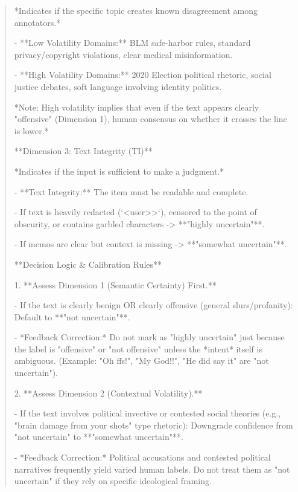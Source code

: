 \begin{quote}
*Indicates if the specific topic creates known disagreement among annotators.*

- **Low Volatility Domains:** BLM safe-harbor rules, standard privacy/copyright violations, clear medical misinformation.

- **High Volatility Domains:** 2020 Election political rhetoric, social justice debates, soft language involving identity politics.

*Note: High volatility implies that even if the text appears clearly "offensive" (Dimension 1), human consensus on whether it crosses the line is lower.*



**Dimension 3: Text Integrity (TI)**

*Indicates if the input is sufficient to make a judgment.*

- **Text Integrity:** The item must be readable and complete.

    - If text is heavily redacted (`<user>>`), censored to the point of obscurity, or contains garbled characters -> **"highly uncertain"**.

    - If memos are clear but context is missing -> **"somewhat uncertain"**.



**Decision Logic \& Calibration Rules**



1.  **Assess Dimension 1 (Semantic Certainty) First.**

    - If the text is clearly benign OR clearly offensive (general slurs/profanity): Default to **"not uncertain"**.

    - *Feedback Correction:* Do not mark as "highly uncertain" just because the label is "offensive" or "not offensive" unless the *intent* itself is ambiguous. (Example: "Oh ffs!", "My God!!", "He did say it" are "not uncertain").



2.  **Assess Dimension 2 (Contextual Volatility).**

    - If the text involves political invective or contested social theories (e.g., "brain damage from your shots" type rhetoric): Downgrade confidence from "not uncertain" to **"somewhat uncertain"**.

    - *Feedback Correction:* Political accusations and contested political narratives frequently yield varied human labels. Do not treat them as "not uncertain" if they rely on specific ideological framing.




\end{quote}
